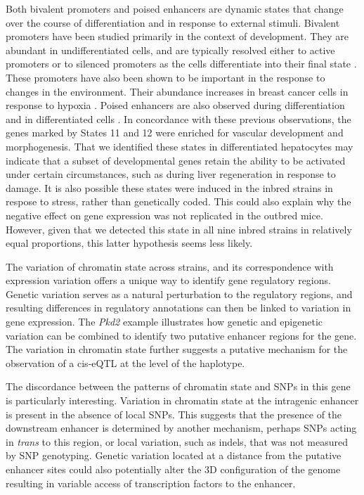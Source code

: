 \documentclass[
  11pt,
]{article}
\begin{document}
Both bivalent promoters and poised enhancers are dynamic states that
change over the course of differentiation and in response to external
stimuli. Bivalent promoters have been studied primarily in the context
of development. They are abundant in undifferentiated cells, and are
typically resolved either to active promoters or to silenced promoters
as the cells differentiate into their final state
\citep{pmid23788621, pmid22513113}. These promoters have also been shown
to be important in the response to changes in the environment. Their
abundance increases in breast cancer cells in response to hypoxia
\citep{pmid27800026}. Poised enhancers are also observed during
differentiation and in differentiated cells \citep{pmid32432110}. In
concordance with these previous observations, the genes marked by States
11 and 12 were enriched for vascular development and morphogenesis. That
we identified these states in differentiated hepatocytes may indicate
that a subset of developmental genes retain the ability to be activated
under certain circumstances, such as during liver regeneration in
response to damage. It is also possible these states were induced in the
inbred strains in respose to stress, rather than genetically coded. This
could also explain why the negative effect on gene expression was not
replicated in the outbred mice. However, given that we detected this
state in all nine inbred strains in relatively equal proportions, this
latter hypothesis seems less likely.

The variation of chromatin state across strains, and its correspondence
with expression variation offers a unique way to identify gene
regulatory regions. Genetic variation serves as a natural perturbation
to the regulatory regions, and resulting differences in regulatory
annotations can then be linked to variation in gene expression. The
\textit{Pkd2} example illustrates how genetic and epigenetic variation
can be combined to identify two putative enhancer regions for the gene.
The variation in chromatin state further suggests a putative mechanism
for the observation of a cis-eQTL at the level of the haplotype.

The discordance between the patterns of chromatin state and SNPs in this
gene is particularly interesting. Variation in chromatin state at the
intragenic enhancer is present in the absence of local SNPs. This
suggests that the presence of the downstream enhancer is determined by
another mechanism, perhaps SNPs acting in \emph{trans} to this region,
or local variation, such as indels, that was not measured by SNP
genotyping. Genetic variation located at a distance from the putative
enhancer sites could also potentially alter the 3D configuration of the
genome resulting in variable access of transcription factors to the
enhancer.
\end{document}
